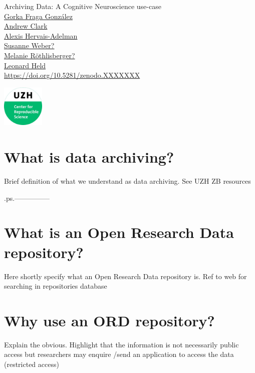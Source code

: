 \documentclass[a4paper,11pt]{report}
\renewcommand\url[1]{{\href{#1}{#1}}}
\begin{document}
\begin{minipage}{\textwidth}
    {\Huge \textcolor{swissRNblue}{Archiving Data: A Cognitive Neuroscience use-case}} \\[0.5ex]
    \href{https://orcid.org/0000-0002-1857-8607}{Gorka Fraga González}\\
    \href{https://orcid.org/xxxx}{Andrew Clark}\\
    \href{https://orcid.org/xxxx}{Alexis Hervais-Adelman }\\    
    \href{https://orcid.org/xxxx}{Susanne Weber?}\\
    \href{https://orcid.org/xxxx}{Melanie Röthlisberger?}\\    
    \href{https://orcid.org/xxxx}{Leonard Held}\\
    \url{https://doi.org/10.5281/zenodo.XXXXXXX}
\end{minipage}%
\begin{minipage}{0.02\textwidth}
    \centering
    \includegraphics[height=2cm]{CRS.jpg}
\end{minipage}%


\section*{What is data archiving?}
Brief definition of what we understand as data archiving. See UZH ZB resources 

.ps.---------------

\section*{What is an Open Research Data repository?}
Here shortly specify what an Open Research Data repository is. Ref to web for searching in repositories database 

\section*{Why use an ORD repository?}
Explain the obvious. Highlight that the information is not necessarily public access but researchers may enquire /send an application to access the data (restricted access)
\end{document}

